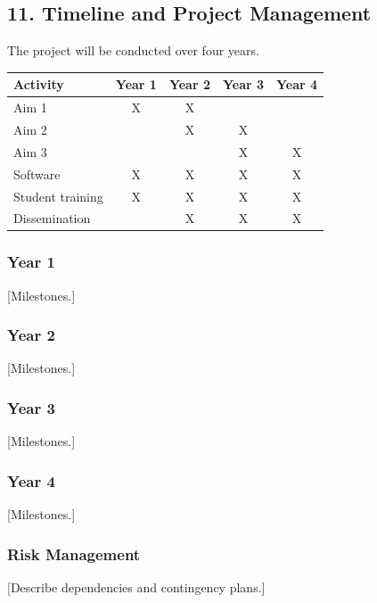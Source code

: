\documentclass[
  11pt,
  letterpaper,
]{article}
\begin{document}
\subsection{11. Timeline and Project
Management}\label{timeline-and-project-management}

The project will be conducted over four years.

\begin{longtable}[]{@{}lcccc@{}}
\toprule\noalign{}
Activity & Year 1 & Year 2 & Year 3 & Year 4 \\
\midrule\noalign{}
\endhead
\bottomrule\noalign{}
\endlastfoot
Aim 1 & X & X & & \\
Aim 2 & & X & X & \\
Aim 3 & & & X & X \\
Software & X & X & X & X \\
Student training & X & X & X & X \\
Dissemination & & X & X & X \\
\end{longtable}

\subsubsection{Year 1}\label{year-1}

{[}Milestones.{]}

\subsubsection{Year 2}\label{year-2}

{[}Milestones.{]}

\subsubsection{Year 3}\label{year-3}

{[}Milestones.{]}

\subsubsection{Year 4}\label{year-4}

{[}Milestones.{]}

\subsubsection{Risk Management}\label{risk-management}

{[}Describe dependencies and contingency plans.{]}
\end{document}
